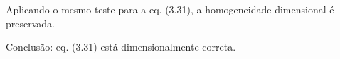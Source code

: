 Aplicando o mesmo teste para a eq. (3.31), a homogeneidade dimensional é preservada.

Conclusão: eq. (3.31) está dimensionalmente correta.

